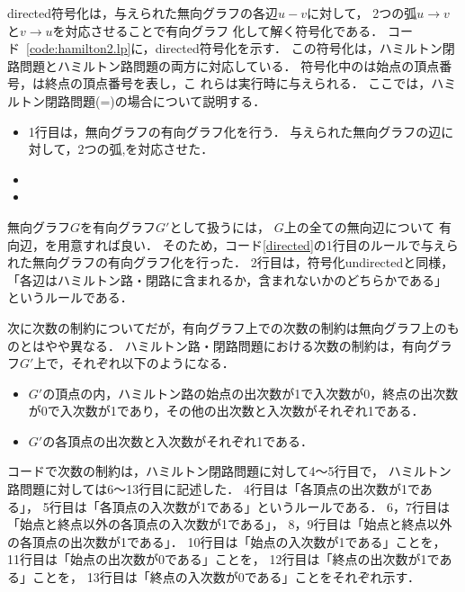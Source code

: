 

\textsf{directed}符号化は，与えられた無向グラフの各辺$u-v$に対して，
2つの弧$u\rightarrow v$と$v\rightarrow u$を対応させることで有向グラフ
化して解く符号化である．
コード~\ref{code:hamilton2.lp}に，\textsf{directed}符号化を示す．
この符号化は，ハミルトン閉路問題とハミルトン路問題の両方に対応している．
符号化中のは始点の頂点番号，は終点の頂点番号を表し，こ
れらは実行時に与えられる．
ここでは，ハミルトン閉路問題(=)の場合について説明する．

\begin{itemize}
\item 1行目は，無向グラフの有向グラフ化を行う．
  与えられた無向グラフの辺に対して，2つの弧,を対応させた．
  
\item
\item
\end{itemize}


\vspace{3em}

無向グラフ$G$を有向グラフ$G'$として扱うには，
$G$上の全ての無向辺について
有向辺，を用意すれば良い．
そのため，コード\ref{directed}の1行目のルールで与えられた無向グラフの有向グラフ化を行った．
2行目は，符号化undirectedと同様，
「各辺はハミルトン路・閉路に含まれるか，含まれないかのどちらかである」
というルールである．

次に次数の制約についてだが，有向グラフ上での次数の制約は無向グラフ上のものとはやや異なる．
ハミルトン路・閉路問題における次数の制約は，有向グラフ$G'$上で，それぞれ以下のようになる．
\begin{itemize}
\item $G'$の頂点の内，ハミルトン路の始点の出次数が1で入次数が0，終点の出次数が0で入次数が1であり，その他の出次数と入次数がそれぞれ1である．
\item $G'$の各頂点の出次数と入次数がそれぞれ1である．
\end{itemize}
コードで次数の制約は，ハミルトン閉路問題に対して4〜5行目で，
ハミルトン路問題に対しては6〜13行目に記述した．
4行目は「各頂点の出次数が1である」，
5行目は「各頂点の入次数が1である」というルールである．
6，7行目は「始点と終点以外の各頂点の入次数が1である」，
8，9行目は「始点と終点以外の各頂点の出次数が1である」．
10行目は「始点の入次数が1である」ことを，
11行目は「始点の出次数が0である」ことを，
12行目は「終点の出次数が1である」ことを，
13行目は「終点の入次数が0である」ことをそれぞれ示す．

